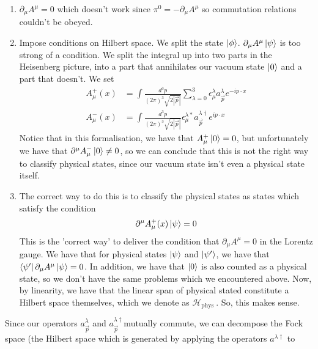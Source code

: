 \begin{enumerate}
	\item $ \partial  _ \mu A ^ \mu  = 0 $ which doesn't work since $\pi ^ 0  = -\partial _ \mu A ^ \mu $ 
		so commutation relations couldn't be obeyed.
	\item Impose conditions on Hilbert space. We split the 
		state $\ket{ \phi } $. $ \partial  _ \mu A ^ \mu \ket{ \psi } $ 
		is too strong of a condition. 
		We split the integral up into two parts in the Heisenberg picture, into 
		a part that annihilates our vacuum state $ \ket{ 0 }  $ and 
		a part that doesn't. 
		We set
		 \begin{align*}
			 A^ +  _ \mu ( x )  &=  \int \frac{ d^ 3 p }{ \left( 2 \pi  \right)  ^ 3 \sqrt{ 2 | \vec{p} | } }  \sum_{ \lambda = 0 } ^ 3 \epsilon _{ \mu } ^{ \lambda } a _{ \vec{p} } ^ \lambda e ^{  - i p \cdot  x }\\ 
			 A ^ - _ \mu ( x) &=  \int \frac{ d ^ 3 p }{ \left(  2 \pi  \right)  ^ 3 \sqrt{ 2 | \vec{p} | }  } \epsilon_{ \mu } ^{ \lambda * } a _{ \vec{p} } ^{ \lambda \dagger } e ^{ i p \cdot  x  } 
		 \end{align*}
		 Notice that in this formalisation, we have that $ A ^ + _ \mu \ket{ 0 }  =0 $, 
		but unfortunately we have that $ \partial  ^ \mu A ^ - _ \mu \ket{ 0 }  \neq 0 $, 
		so we can conclude that this is not the right way to classify physical states, 
		since our vacuum state isn't even a physical state itself.
	\item The correct way to do this is to classify the physical states
		as states which satisfy the condition 
		\[
			\partial ^ \mu A _ \mu ^ + ( x) \ket{ \psi }  = 0
		\] This is the 'correct way' to  deliver the 
		condition that $ \partial _ \mu A ^ \mu = 0  $ 
		in the Lorentz gauge. We have that 
		for physical states $ \ket{ \psi } $ and 
		$ \ket{ \psi ' } $, we have that  $ \bra{ \psi ' }\partial  _ \mu A ^ \mu \ket{ \psi }  = 0$. 
		In addition, we have that $ \ket{ 0 } $ is also counted 
		as a physical state, so we don't have the 
		same problems which we encountered above. 
		Now, by linearity, we have that the linear span 
		of physical stated constitute a Hilbert space 
		themselves, which we denote as $ \mathcal{ H } _{ \text{phys } } $.
		So, this makes sense. 
\end{enumerate}
Since our operators $ a^ \lambda_{ \vec{p} } $  and 
$ a ^{ \lambda \dagger } _{ \vec{p} } $mutually commute, 
we can decompose the Fock space (the Hilbert space which is 
generated by applying the operators $ a^{ \lambda \dagger }$ to 
